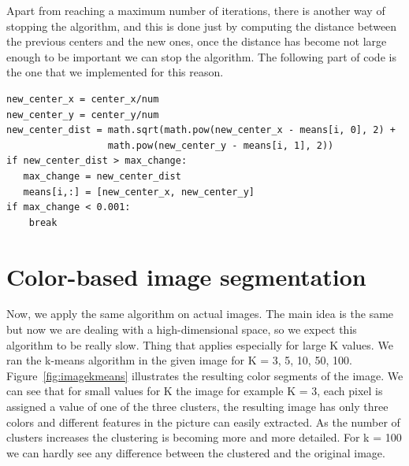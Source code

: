 \documentclass[a4paper,10pt,twoside]{article}
\begin{document}
Apart from reaching a maximum number of iterations, there is another way of stopping the algorithm, and this is done just by computing the distance between the previous centers and the new ones, once the distance has become not large enough to be important we can stop the algorithm. The following part of code is the one that we implemented for this reason.
\begin{verbatim}
new_center_x = center_x/num
new_center_y = center_y/num
new_center_dist = math.sqrt(math.pow(new_center_x - means[i, 0], 2) + 
                  math.pow(new_center_y - means[i, 1], 2))
if new_center_dist > max_change:
   max_change = new_center_dist
   means[i,:] = [new_center_x, new_center_y]
if max_change < 0.001:
    break
\end{verbatim}

\section{Color-based image segmentation}
Now, we apply the same algorithm on actual images. The main idea is the same but now we are dealing with a high-dimensional space, so we expect this algorithm to be really slow. Thing that applies especially for large K values. We ran the k-means algorithm in the given image for K = 3, 5, 10, 50, 100. Figure~\ref{fig:imagekmeans} illustrates the resulting color segments of the image. We can see that for small values for K the image for example K = 3, each pixel is assigned a value of one of the three clusters, the resulting image has only three colors and different features in the picture can easily extracted. As the number of clusters increases the clustering is becoming more and more detailed. For k = 100 we can hardly see any difference between the clustered and the original image.
\end{document}
